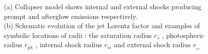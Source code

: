 \begin{figure}[hpbt]
\caption{(a) Collapser  model  shows internal and external shocks producing prompt and afterglow emissions respectively. \\ (b) Schematic evolution of the jet Lorentz factor and examples of symbolic locations of radii : the saturation radius $r_{s} $ , photospheric radius $r_{ph} $ , internal shock radius $ r_{is} $ and external shock  radius  $ r_{_{es}} $}
\label{GRB prompt emission}
\end{figure}
